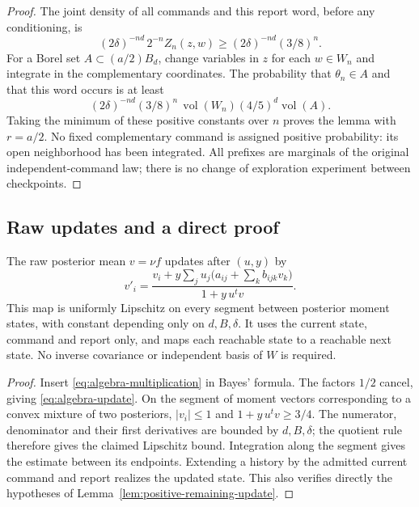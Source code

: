\begin{proof}
The joint density of all commands and this report word, before any
conditioning, is
\[
 (2\delta)^{-nd}\,2^{-n}Z_n(z,w)
                         \ge (2\delta)^{-nd}(3/8)^n.
\]
For a Borel set $A\subset(a/2)B_d$, change variables in $z$ for each
$w\in W_n$ and integrate in the complementary coordinates. The
probability that $\theta_n\in A$ and that this word occurs is at least
\[
 (2\delta)^{-nd}(3/8)^n\,\operatorname{vol}(W_n)
                                      (4/5)^d\operatorname{vol}(A).
\]
Taking the minimum of these positive constants over $n$ proves the
lemma with $r=a/2$. No fixed complementary command is assigned
positive probability: its open neighborhood has been integrated.
All prefixes are marginals of the original independent-command law;
there is no change of exploration experiment between checkpoints.
\end{proof}

\subsection{Raw updates and a direct proof}
\begin{lemma}
\label{lem:algebra-update}
The raw posterior mean $v=\nu f$ updates after $(u,y)$ by
\begin{equation}\label{eq:algebra-update}
 v'_i=\frac{v_i+y\sum_j u_j\bigl(a_{ij}+\sum_k b_{ijk}v_k\bigr)}
                        {1+y\,u^tv}.
\end{equation}
This map is uniformly Lipschitz on every segment between posterior
moment states, with constant depending only on $d,B,\delta$.
It uses the current state, command and report only, and maps each
reachable state to a reachable next state. No inverse covariance or
independent basis of $W$ is required.
\end{lemma}
\begin{proof}
Insert \eqref{eq:algebra-multiplication} in Bayes' formula. The factors
$1/2$ cancel, giving \eqref{eq:algebra-update}. On the segment of
moment vectors corresponding to a convex mixture of two posteriors,
$|v_i|\le1$ and $1+y\,u^tv\ge3/4$. The numerator, denominator and
their first derivatives are bounded by $d,B,\delta$; the quotient rule
therefore gives the claimed Lipschitz bound. Integration along the
segment gives the estimate between its endpoints. Extending a history
by the admitted current command and report realizes the updated state.
This also verifies directly the hypotheses of
Lemma~\ref{lem:positive-remaining-update}.
\end{proof}

